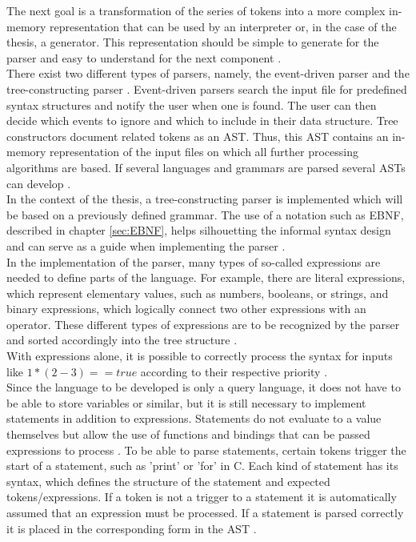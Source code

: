 The next goal is a transformation of the series of tokens into a more complex in-memory representation that can be used by an interpreter or, in the case of the thesis, a generator. This representation should be simple to generate for the parser and easy to understand for the next component \parencite[cf.][p. 59]{nystrom_crafting_2021}.\\
There exist two different types of parsers, namely, the event-driven parser and the tree-constructing parser \parencite[cf.][p. 5]{sarkar_code_2001}. Event-driven parsers search the input file for predefined syntax structures and notify the user when one is found. The user can then decide which events to ignore and which to include in their data structure. Tree constructors document related tokens as an \ac{AST}. Thus, this \ac{AST} contains an in-memory representation of the input files on which all further processing algorithms are based. If several languages and grammars are parsed several \ac{AST}s can develop \parencite[cf.][pp. 5-6]{sarkar_code_2001}.\\
In the context of the thesis, a tree-constructing parser is implemented which will be based on a previously defined grammar. The use of a notation such as \ac{EBNF}, described in chapter \ref{sec:EBNF}, helps silhouetting the informal syntax design and can serve as a guide when implementing the parser \parencite[cf.][p. 64]{nystrom_crafting_2021}.\\
In the implementation of the parser, many types of so-called expressions are needed to define parts of the language. For example, there are literal expressions, which represent elementary values, such as numbers, booleans, or strings, and binary expressions, which logically connect two other expressions with an operator. These different types of expressions are to be recognized by the parser and sorted accordingly into the tree structure \parencite[see][pp. 64-68]{nystrom_crafting_2021}.\\
With expressions alone, it is possible to correctly process the syntax for inputs like $1 * (2 - 3) == true$ according to their respective priority \parencite[cf.][p. 64]{nystrom_crafting_2021}.\\
Since the language to be developed is only a query language, it does not have to be able to store variables or similar, but it is still necessary to implement statements in addition to expressions. Statements do not evaluate to a value themselves but allow the use of functions and bindings that can be passed expressions to process \parencite[cf.][pp. 111-112]{nystrom_crafting_2021}. To be able to parse statements, certain tokens trigger the start of a statement, such as 'print' or 'for' in C. Each kind of statement has its syntax, which defines the structure of the statement and expected tokens/expressions. If a token is not a trigger to a statement it is automatically assumed that an expression must be processed. If a statement is parsed correctly it is placed in the corresponding form in the \ac{AST} \parencite[cf.][pp. 113-116]{nystrom_crafting_2021}.\\
